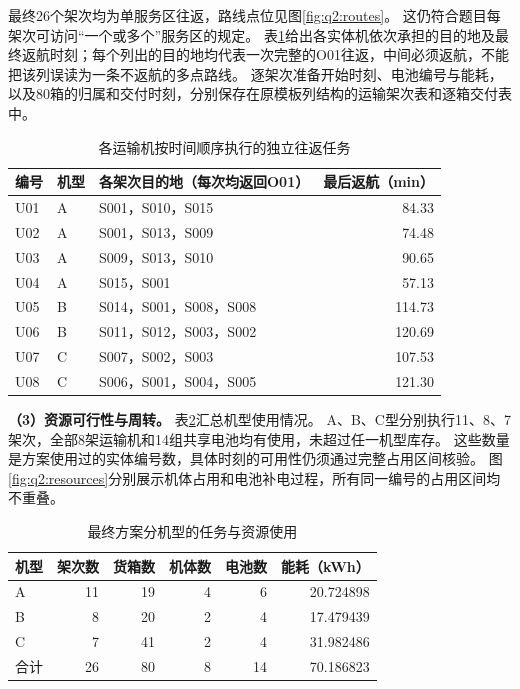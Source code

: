 最终26个架次均为单服务区往返，路线点位见图\ref{fig:q2:routes}。
这仍符合题目每架次可访问“一个或多个”服务区的规定。
表\ref{tab:q2:drone-schedule}给出各实体机依次承担的目的地及最终返航时刻；每个列出的目的地均代表一次完整的O01往返，中间必须返航，不能把该列误读为一条不返航的多点路线。
逐架次准备开始时刻、电池编号与能耗，以及80箱的归属和交付时刻，分别保存在原模板列结构的运输架次表和逐箱交付表中。

\begin{table}[htbp]
  \centering
  \caption{各运输机按时间顺序执行的独立往返任务}
  \label{tab:q2:drone-schedule}
  \begin{tabular}{lllr}
    \toprule
    编号 & 机型 & 各架次目的地（每次均返回O01） & 最后返航（min） \\
    \midrule
    U01 & A & S001，S010，S015 & 84.33 \\
    U02 & A & S001，S013，S009 & 74.48 \\
    U03 & A & S009，S013，S010 & 90.65 \\
    U04 & A & S015，S001 & 57.13 \\
    U05 & B & S014，S001，S008，S008 & 114.73 \\
    U06 & B & S011，S012，S003，S002 & 120.69 \\
    U07 & C & S007，S002，S003 & 107.53 \\
    U08 & C & S006，S001，S004，S005 & 121.30 \\
    \bottomrule
  \end{tabular}
\end{table}

\textbf{（3）资源可行性与周转。}
表\ref{tab:q2:type-use}汇总机型使用情况。
A、B、C型分别执行11、8、7架次，全部8架运输机和14组共享电池均有使用，未超过任一机型库存。
这些数量是方案使用过的实体编号数，具体时刻的可用性仍须通过完整占用区间核验。
图\ref{fig:q2:resources}分别展示机体占用和电池补电过程，所有同一编号的占用区间均不重叠。

\begin{table}[htbp]
  \centering
  \caption{最终方案分机型的任务与资源使用}
  \label{tab:q2:type-use}
  \begin{tabular}{lrrrrr}
    \toprule
    机型 & 架次数 & 货箱数 & 机体数 & 电池数 & 能耗（kWh） \\
    \midrule
    A & 11 & 19 & 4 & 6 & 20.724898 \\
    B & 8 & 20 & 2 & 4 & 17.479439 \\
    C & 7 & 41 & 2 & 4 & 31.982486 \\
    合计 & 26 & 80 & 8 & 14 & 70.186823 \\
    \bottomrule
  \end{tabular}
\end{table}

